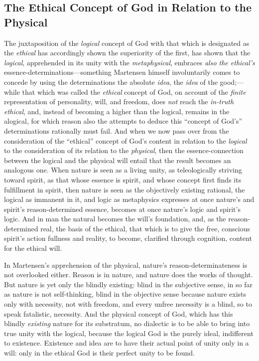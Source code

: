 \documentclass[12pt,a4paper]{book}
\begin{document}
\subsection{The Ethical Concept of God in Relation to the Physical}
\label{ssec:ethical-physical}

The juxtaposition of the \emph{logical} concept of God with that which is designated
as the \emph{ethical} has accordingly shown the superiority of the first, has shown that the
\emph{logical}, apprehended in its unity with the \emph{metaphysical}, embraces \emph{also the
ethical's} essence-determinations---something Martensen himself involuntarily comes
to concede by using the determinations the absolute \emph{idea}, the \emph{idea} of the good;---while
that which was called the \emph{ethical} concept of God, on account of the \emph{finite}
representation of personality, will, and freedom, does \emph{not} reach the \emph{in-truth ethical},
and, instead of becoming a higher than the logical, remains in the alogical, for which
reason also the attempts to deduce this ``concept of God's'' determinations rationally
must fail. And when we now pass over from the consideration of the ``ethical'' concept
of God's content in relation to the \emph{logical} to the consideration of its relation to the
\emph{physical}, then the essence-connection between the logical and the physical will entail
that the result becomes an analogous one. When nature is seen as a living unity, as
teleologically striving toward spirit, as that whose essence is spirit, and whose
concept first finds its fulfillment in spirit, then nature is seen as the objectively
existing rational, the logical as immanent in it, and logic as metaphysics expresses at
once nature's and spirit's reason-determined essence, becomes at once nature's logic and
spirit's logic. And in man the natural becomes the will's foundation, and, as the
reason-determined real, the basis of the ethical, that which is to give the free,
conscious spirit's action fullness and reality, to become, clarified through cognition,
content for the ethical will.

In Martensen's apprehension of the physical, nature's reason-determinateness is not
overlooked either. Reason is in nature, and nature does the works of thought. But nature
is yet only the blindly existing: blind in the subjective sense, in so far as nature is
not self-thinking, blind in the objective sense because nature exists only with
necessity, not with freedom, and every unfree necessity is a blind, so to speak
fatalistic, necessity. And the physical concept of God, which has this blindly \emph{existing}
nature for its substratum, no dialectic is to be able to bring into true unity with the
logical, because the logical God is the purely ideal, indifferent to existence. Existence
and idea are to have their actual point of unity only in a will: only in the ethical God
is their perfect unity to be found.
\end{document}

